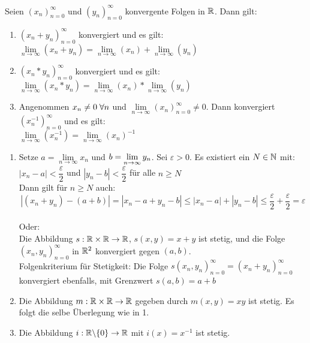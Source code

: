 \documentclass[main.tex]{subfiles}
\begin{document}
\begin{Theorem}
  Seien $(x_n)_{n=0}^\infty$ und $(y_n)_{n=0}^\infty$ konvergente Folgen in $\mathbb{R}$. Dann gilt:
  \begin{enumerate}
    \item $(x_n + y_n)_{n=0}^\infty$ konvergiert und es gilt:\\
      $\lim \limits_{n \to \infty} (x_n + y_n) = \lim \limits_{n \to \infty} (x_n) + \lim \limits_{n \to \infty} (y_n)$
    \item $(x_n * y_n)_{n=0}^\infty$ konvergiert und es gilt:\\
      $\lim \limits_{n \to \infty} (x_n * y_n) = \lim \limits_{n \to \infty} (x_n) * \lim \limits_{n \to \infty} (y_n)$
    \item Angenommen $x_n \neq 0 \;\forall n$ und $\lim \limits_{n \to \infty} (x_n)_{n=0}^\infty \neq 0$. Dann konvergiert $(x_n^{-1})_{n=0}^\infty$ und es gilt:\\
      $\lim \limits_{n\to \infty} (x_n^{-1}) = \lim \limits_{n\to \infty} (x_n)^{-1}$
  \end{enumerate}
\end{Theorem}

\begin{Beweis}
  \begin{enumerate}
    \item Setze $a = \lim \limits_{n \to \infty} x_n$ und $b = \lim \limits_{n \to \infty} y_n$. Sei $\varepsilon >0$. Es existiert ein $N \in \mathbb{N}$ mit:\\
      $|x_n - a|< \dfrac{\varepsilon}{2}$ und $|y_n - b|< \dfrac{\varepsilon}{2}$ für alle $n \geq N$\\
      Dann gilt für $n\geq N$ auch:
      $$|(x_n+y_n) - (a+b)| = |x_n -a + y_n -b| \leq |x_n -a| + |y_n -b| \leq \dfrac{\varepsilon}{2} + \dfrac{\varepsilon}{2} = \varepsilon$$\\
      Oder:\\
      Die Abbildung $s:\mathbb{R} \times \mathbb{R} \to \mathbb{R}$, $s(x,y) = x+y$ ist stetig, und die Folge $(x_n , y_n)_{n=0}^\infty$ in $\mathbb{R}^2$ konvergiert gegen $(a,b)$.\\
      Folgenkriterium für Stetigkeit: Die Folge $s(x_n , y_n)_{n=0}^\infty = (x_n + y_n)_{n=0}^\infty$ konvergiert ebenfalls, mit Grenzwert $s(a,b)=a+b$
    \item Die Abbildung $m: \mathbb{R} \times \mathbb{R} \to \mathbb{R}$ gegeben durch $m(x,y) = xy$ ist stetig. Es folgt die selbe Überlegung wie in 1.
    \item Die Abbildung $i: \mathbb{R}\backslash\{0\} \to \mathbb{R}$ mit $i(x) = x^{-1}$ ist stetig.
  \end{enumerate}
\end{Beweis}
\end{document}
